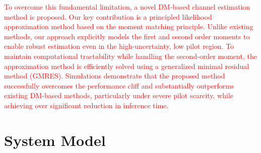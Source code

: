 \documentclass[lettersize,journal]{IEEEtran}
\newcommand{\tred}{\textcolor{red}}
\begin{document}
\tred{
To overcome this fundamental limitation, a novel DM-based channel estimation method is proposed. Our key contribution is a principled likelihood approximation method based on the moment matching principle. Unlike existing methods, our approach explicitly models the first and second order moments to enable robust estimation even in the high-uncertainty, low pilot region. To maintain computational tractability while handling the second-order moment, the approximation method is efficiently solved using a generalized minimal residual method (GMRES). Simulations demonstrate that the proposed method successfully overcomes the performance cliff and substantially outperforms existing DM-based methods, particularly under severe pilot scarcity, while achieving over significant reduction in inference time.
}

\section{System Model}
\end{document}
